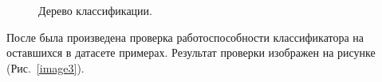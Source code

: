 \documentclass[12pt, a4paper]{article}
\begin{document}
    \begin{figure} [h]
        \caption{Дерево классификации.}
        \label{image2}
    \end{figure}
    
    После была произведена проверка работоспособности классификатора на оставшихся в датасете примерах. Результат проверки изображен на рисунке (Рис.~\ref{image3}).
    
\end{document}

